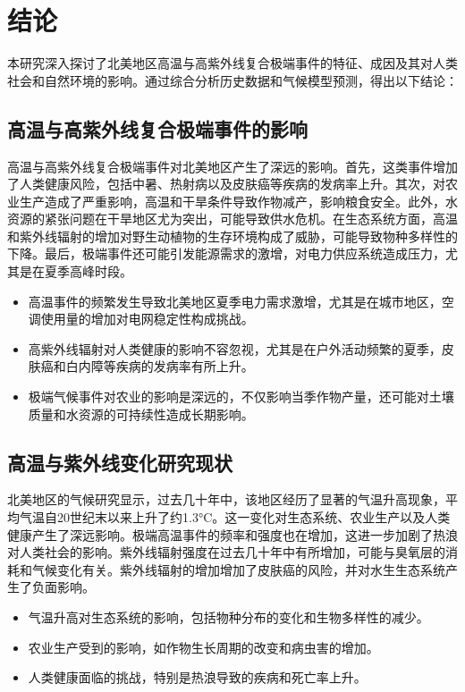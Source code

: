 \documentclass[12pt]{article}
\begin{document}
\section{结论}
本研究深入探讨了北美地区高温与高紫外线复合极端事件的特征、成因及其对人类社会和自然环境的影响。通过综合分析历史数据和气候模型预测，得出以下结论：

\subsection{高温与高紫外线复合极端事件的影响}
高温与高紫外线复合极端事件对北美地区产生了深远的影响。首先，这类事件增加了人类健康风险，包括中暑、热射病以及皮肤癌等疾病的发病率上升。其次，对农业生产造成了严重影响，高温和干旱条件导致作物减产，影响粮食安全。此外，水资源的紧张问题在干旱地区尤为突出，可能导致供水危机。在生态系统方面，高温和紫外线辐射的增加对野生动植物的生存环境构成了威胁，可能导致物种多样性的下降。最后，极端事件还可能引发能源需求的激增，对电力供应系统造成压力，尤其是在夏季高峰时段。

\begin{itemize}
\item 高温事件的频繁发生导致北美地区夏季电力需求激增，尤其是在城市地区，空调使用量的增加对电网稳定性构成挑战。
\item 高紫外线辐射对人类健康的影响不容忽视，尤其是在户外活动频繁的夏季，皮肤癌和白内障等疾病的发病率有所上升。
\item 极端气候事件对农业的影响是深远的，不仅影响当季作物产量，还可能对土壤质量和水资源的可持续性造成长期影响。
\end{itemize}

\subsection{高温与紫外线变化研究现状}
北美地区的气候研究显示，过去几十年中，该地区经历了显著的气温升高现象，平均气温自20世纪末以来上升了约1.3°C。这一变化对生态系统、农业生产以及人类健康产生了深远影响。极端高温事件的频率和强度也在增加，这进一步加剧了热浪对人类社会的影响。紫外线辐射强度在过去几十年中有所增加，可能与臭氧层的消耗和气候变化有关。紫外线辐射的增加增加了皮肤癌的风险，并对水生生态系统产生了负面影响。

\begin{itemize}
\item 气温升高对生态系统的影响，包括物种分布的变化和生物多样性的减少。
\item 农业生产受到的影响，如作物生长周期的改变和病虫害的增加。
\item 人类健康面临的挑战，特别是热浪导致的疾病和死亡率上升。
\end{itemize}
\end{document}
